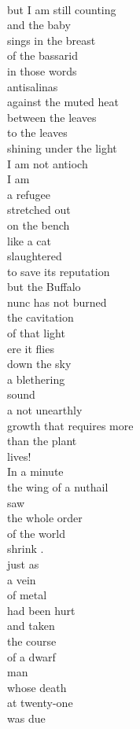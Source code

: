 \documentclass[smalldemyvopaper,11pt,twoside,onecolumn,openright,extrafontsizes]{memoir}
\begin{document}
\\but I am still counting
\\and the baby
\\sings in the breast
\\of the bassarid
\\in those words
\\antisalinas
\\against the muted heat
\\between the leaves
\\to the leaves
\\shining under the light
\\I am not antioch
\\I am
\\a refugee
\\stretched out
\\on the bench
\\like a cat
\\slaughtered
\\to save its reputation
\\but the Buffalo
\\nunc has not burned
\\the cavitation
\\of that light
\\ere it flies
\\down the sky
\\a blethering
\\sound
\\a not unearthly
\\growth that requires more
\\than the plant
\\lives!
\\In a minute
\\the wing of a nuthail
\\saw
\\the whole order
\\of the world
\\shrink .
\\just as
\\a vein
\\of metal
\\had been hurt
\\and taken
\\the course
\\of a dwarf
\\man
\\whose death
\\at twenty-one
\\was due
\end{document}
